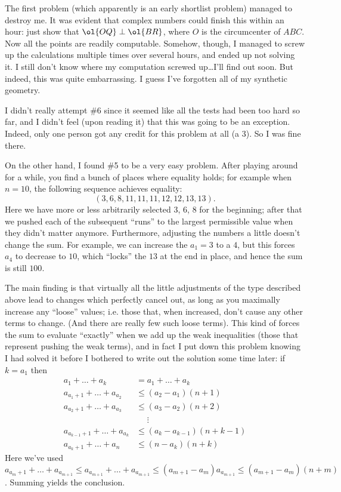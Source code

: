 \documentclass[11pt]{scrreprt}
\begin{document}
The first problem (which apparently is an early shortlist problem) managed to destroy me. It was evident that complex numbers could finish this within an hour: just show that $\ol{OQ} \perp \ol{BR}$, where $O$ is the circumcenter of $ABC$. Now all the points are readily computable.
Somehow, though, I managed to screw up the calculations multiple times over several hours, and ended up not solving it. I still don't know where my computation screwed up\dots I'll find out soon. But indeed, this was quite embarrassing. I guess I've forgotten all of my synthetic geometry.

I didn't really attempt \#6 since it seemed like all the tests had been too hard so far, and I didn't feel (upon reading it) that this was going to be an exception. Indeed, only one person got any credit for this problem at all (a 3). So I was fine there.

On the other hand, I found \#5 to be a very easy problem. After playing around for a while, you find a bunch of places where equality holds; for example when $n=10$, the following sequence achieves equality:
\[ \left( 3,6,8,11,11,11,12,12,13,13 \right). \]
Here we have more or less arbitrarily selected $3$, $6$, $8$ for the beginning; after that we pushed each of the subsequent ``runs'' to the largest permissible value when they didn't matter anymore.
Furthermore, adjusting the numbers a little doesn't change the sum. For example, we can increase the $a_1 = 3$ to a $4$, but this forces $a_4$ to decrease to $10$, which ``locks'' the $13$ at the end in place, and hence the sum is still $100$.

The main finding is that virtually all the little adjustments of the type described above lead to changes which perfectly cancel out, as long as you maximally increase any ``loose'' values; {i.e.} those that, when increased, don't cause any other terms to change. (And there are really few such loose terms).
This kind of forces the sum to evaluate ``exactly'' when we add up the weak inequalities (those that represent pushing the weak terms), and in fact I put down this problem knowing I had solved it before I bothered to write out the solution some time later: if $k=a_1$ then
\begin{align*}
  a_1 + \dots + a_k &= a_1 + \dots + a_k \\
  a_{a_1+1} + \dots + a_{a_2} &\le \left( a_2-a_1 \right)\left( n+1 \right) \\
  a_{a_2+1} + \dots + a_{a_3} &\le (a_3-a_2)(n+2) \\
  &\phantom\le\vdots \\
  a_{a_{k-1}+1} + \dots + a_{a_k} &\le \left( a_k-a_{k-1} \right)(n+k-1) \\
  a_{a_k+1} + \dots + a_n &\le (n-a_k)(n+k)
\end{align*}
Here we've used $a_{a_m+1} + \dots + a_{a_{m+1}} \le a_{a_{m+1}} + \dots + a_{a_{m+1}} \le \left( a_{m+1}-a_m \right)a_{a_{m+1}} \le \left( a_{m+1}-a_m \right)(n+m)$. Summing yields the conclusion.
\end{document}
